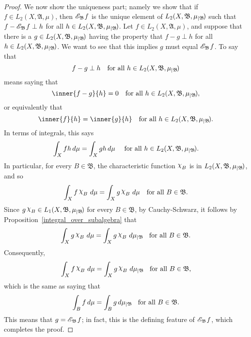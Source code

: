 \documentclass[
twoside=true,
paper=letter,
fontsize=9pt,
pagesize=auto,
leqno,
openany,
headsepline,
overfullrule,
]{scrbook}
\theoremstyle{plain}
\theoremstyle{plain}
\theoremstyle{definition}
\theoremstyle{bfnoteitalic}
\theoremstyle{bfnoteroman}
\newcommand{\sigalg}[1]{\mathfrak{#1}}
\newcommand{\cali}[1]{\mathscr{#1}}
\newcommand{\condexpsub}[2]
{\mathop{\cali{E}\hspace{-1.5pt}}\nolimits_{#2}\hspace{-1pt}#1}
\newcommand{\charfunction}[1]{\mathop{{\raisebox{2pt}{$\chi$}}_{#1}}}
\newcommand{\restrictedto}[1]{_{\lvert#1}\kern-1.5pt}
\newcommand{\sigmaalgebra}{\sigalg{A}}
\newcommand{\sigmaalgebraii}{\sigalg{B}}
\newcommand{\function}{f}
\newcommand{\functionii}{g}
\newcommand{\functioniii}{h}
\newcommand{\measurespace}{X}
\newcommand{\measure}{\mu}
\begin{document}
\begin{proof}
We now show the uniqueness part; namely we show that if
$\function\in L_2(\measurespace, \sigmaalgebra,\measure)$, then 
$\condexpsub{\function}{\sigmaalgebraii}$ is the
unique element of 
$L_2(\measurespace, \sigmaalgebraii,\measure\restrictedto{\sigmaalgebraii})$
such that 
$\function - \condexpsub{\function}{\sigmaalgebraii} \perp \functioniii$ for all $\functioniii\in
L_2(\measurespace, \sigmaalgebraii,\measure\restrictedto{\sigmaalgebraii})$.
Let
$\function\in L_2(\measurespace, \sigmaalgebra,\measure)$,
and suppose that there is a 
$\functionii \in L_2(\measurespace, \sigmaalgebraii,\measure\restrictedto{\sigmaalgebraii})$
having the property that
$\function-\functionii\perp \functioniii$ for all $\functioniii\in
L_2(\measurespace, \sigmaalgebraii,\measure\restrictedto{\sigmaalgebraii})$.
We want to see that this implies $\functionii$ must equal 
$\condexpsub{\function}{\sigmaalgebraii}$.
To say that 
\[
\function-\functionii\perp \functioniii 
\quad\text{for all $\functioniii\in
L_2(\measurespace, \sigmaalgebraii,\measure\restrictedto{\sigmaalgebraii})$}
\]
means saying that 
\[
\inner{\function-\functionii}{\functioniii} = 0 
\quad\text{for all 
$\functioniii\in L_2(\measurespace, \sigmaalgebraii,\measure\restrictedto{\sigmaalgebraii})$},
\]
or equivalently that 
\[
\inner{\function}{\functioniii} = \inner{\functionii}{\functioniii}
\quad\text{for all 
$\functioniii\in L_2(\measurespace, \sigmaalgebraii,\measure\restrictedto{\sigmaalgebraii})$}.
\]
In terms of integrals, this says
\[
\int_\measurespace \function\functioniii \, d\measure
=
\int_\measurespace \functionii\functioniii \, d\measure
\quad\text{ 
for all
$\functioniii\in L_2(\measurespace, \sigmaalgebraii,\measure\restrictedto{\sigmaalgebraii})$}.
\]
In particular, for every $B\in\sigmaalgebraii$, the characteristic function 
$\charfunction{B}$ is in 
$L_2(\measurespace, \sigmaalgebraii,\measure\restrictedto{\sigmaalgebraii})$, and so
\[
\int_\measurespace \function\charfunction{B} \, d\measure
=
\int_\measurespace \functionii\charfunction{B} \, d\measure
\quad\text{for all
$B\in\sigmaalgebraii$}.
\]
Since 
$\functionii\charfunction{B}
\in L_1(\measurespace, \sigmaalgebraii,\measure\restrictedto{\sigmaalgebraii})$ 
for every $B\in\sigmaalgebraii$, by Cauchy-Schwarz,
it follows by Proposition~\ref{integral_over_subalgebra} that
\[
\int_\measurespace \functionii\charfunction{B}\, d\measure
=
\int_\measurespace \functionii\charfunction{B}\, d\measure\restrictedto{\sigmaalgebraii}
\quad\text{for all
$B\in\sigmaalgebraii$}.
\]
Consequently, 
\[
\int_\measurespace \function\charfunction{B} \, d\measure
=
\int_\measurespace \functionii\charfunction{B} \, d\measure\restrictedto{\sigmaalgebraii}
\quad
\text{for all
$B\in\sigmaalgebraii$,}
\]
which is the same as saying that
\[
\int_B \function \, d\measure
=
\int_B \functionii \, d\measure\restrictedto{\sigmaalgebraii}
\quad\text{for all $B\in\sigmaalgebraii$.}
\]
This means that $\functionii = \condexpsub{\function}{\sigmaalgebraii}$;  in fact, this is the defining feature of $\condexpsub{\function}{\sigmaalgebraii}$, which completes the proof.
\end{proof}
\end{document}
